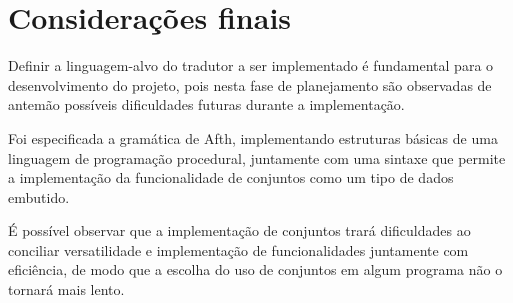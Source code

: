 \documentclass[
	article,			%
	11pt,				%
	oneside,			%
	a4paper,			%
	english,			%
	brazil,				%
	sumario=tradicional
	]{abntex2}
\begin{document}
% 

\section{Considerações finais}

Definir a linguagem-alvo do tradutor a ser implementado é fundamental para o 
desenvolvimento do projeto, pois nesta fase de planejamento são observadas de antemão
possíveis dificuldades futuras durante a implementação.

Foi especificada a gramática de Afth, implementando estruturas básicas de uma
linguagem de programação procedural, juntamente com uma sintaxe que permite
a implementação da funcionalidade de conjuntos como um tipo de dados embutido.

É possível observar que a implementação de conjuntos trará dificuldades
ao conciliar versatilidade e implementação de funcionalidades juntamente
com eficiência, de modo que a escolha do uso de conjuntos em algum programa
não o tornará mais lento.

\postextual



%
%



\end{document}
